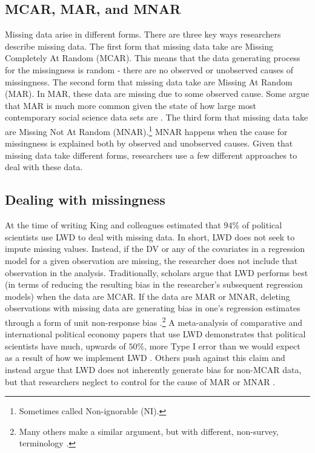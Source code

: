 \documentclass [12pt]{article}
\begin{document}
	\subsection{MCAR, MAR, and MNAR}
Missing data arise in different forms. There are three key ways researchers describe missing data. The first form that missing data take are Missing Completely At Random (MCAR). This means that the data generating process for the missingness is random - there are no observed or unobserved causes of missingness. The second form that missing data take are Missing At Random (MAR). In MAR, these data are missing due to some observed cause. Some argue that MAR is much more common given the state of how large most contemporary social science data sets are \citep{schunk_2008}. The third form that missing data take are Missing Not At Random (MNAR).\footnote{Sometimes called Non-ignorable (NI).} MNAR happens when the cause for missingness is explained both by observed and unobserved causes. Given that missing data take different forms, researchers use a few different approaches to deal with these data.
 	\subsection{Dealing with missingness}
At the time of writing King and colleagues \citeyearpar{king_et-al_2001} estimated that $94\%$ of political scientists use LWD to deal with missing data. In short, LWD does not seek to impute missing values. Instead, if the DV or any of the covariates in a regression model for a given observation are missing, the researcher does not include that observation in the analysis. Traditionally, scholars argue that LWD performs best (in terms of reducing the resulting bias in the researcher's subsequent regression models) when the data are MCAR. If the data are MAR or MNAR, deleting observations with missing data are generating bias in one's regression estimates through a form of unit non-response bias \citep[see][]{weisberg_2005}.\footnote{Many others make a similar argument, but with different, non-survey, terminology \citep[see][to name a few]{king_et-al_2001, schunk_2008, azur_et-al_2011}.} A meta-analysis of comparative and international political economy papers that use LWD demonstrates that political scientists have much, upwards of $50\%$, more Type I error than we would expect as a result of how we implement LWD \citep{lall_2016}. Others push against this claim and instead argue that LWD does not inherently generate bias for non-MCAR data, but that researchers neglect to control for the cause of MAR or MNAR \citep{arel-bundock_pelc_2018}. 
\end{document}
